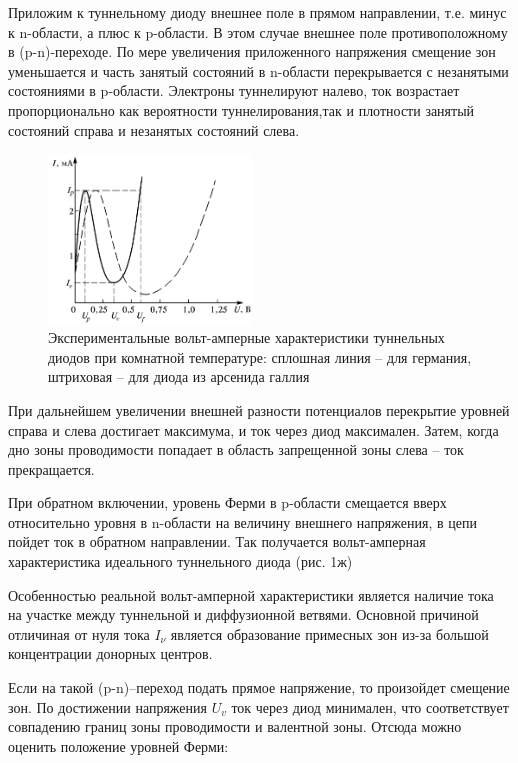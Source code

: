 \documentclass[a4paper,12pt]{article}
\begin{document}
Приложим к туннельному диоду внешнее поле в прямом направлении, т.е. минус к n-области, а плюс к p-области. В этом случае внешнее поле противоположному в (p-n)-переходе. По мере увеличения приложенного напряжения смещение зон уменьшается и часть занятый состояний в n-области перекрывается с незанятыми состояниями в p-области. Электроны туннелируют налево, ток возрастает пропорционально как вероятности туннелирования,так и плотности занятый состояний справа и незанятых состояний слева.

\begin{figure}
  \begin{center}
    \includegraphics[width=0.48\textwidth]{fig2}
  \end{center}
  \caption{Экспериментальные вольт-амперные характеристики туннельных диодов при комнатной температуре: сплошная линия -- для германия, штриховая -- для диода из арсенида галлия}
\end{figure}

При дальнейшем увеличении внешней разности потенциалов перекрытие уровней справа и слева достигает максимума, и ток через диод максимален. Затем, когда дно зоны проводимости попадает в область запрещенной зоны слева -- ток прекращается.

При обратном включении, уровень Ферми в p-области смещается вверх относительно уровня в n-области на величину внешнего напряжения, в цепи пойдет ток в обратном направлении. Так получается вольт-амперная характеристика идеального туннельного диода (рис. 1ж)

Особенностью реальной вольт-амперной характеристики является наличие тока на участке между туннельной и диффузионной ветвями. Основной причиной отличиная от нуля тока $I_\nu$ является образование примесных зон из-за большой концентрации донорных центров. 

Если на такой (p-n)--переход подать прямое напряжение, то произойдет смещение зон. По достижении напряжения $U_v$ ток через диод минимален, что соответствует совпадению границ зоны проводимости и валентной зоны. Отсюда можно оценить положение уровней Ферми:
\end{document}
